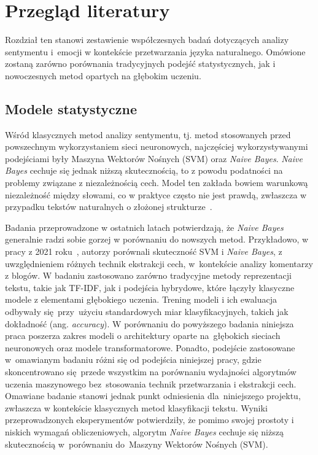 \chapter{Przegląd literatury}
Rozdział ten stanowi zestawienie współczesnych badań dotyczących analizy sentymentu i~emocji w kontekście przetwarzania języka naturalnego. Omówione zostaną zarówno porównania tradycyjnych podejść statystycznych, jak i nowoczesnych metod opartych na głębokim uczeniu.

\section{Modele statystyczne}
Wśród klasycznych metod analizy sentymentu, tj. metod stosowanych przed powszechnym wykorzystaniem sieci neuronowych, najczęściej wykorzystywanymi podejściami były Maszyna Wektorów Nośnych (SVM) oraz \textit{Naive Bayes}. \textit{Naive Bayes} cechuje się jednak niższą skutecznością, to z powodu podatności na problemy związane z niezależnością cech. Model ten zakłada bowiem warunkową niezależność między słowami, co w praktyce często nie jest prawdą, zwłaszcza w przypadku tekstów naturalnych o złożonej strukturze~\cite{OracleBayes}. 

Badania przeprowadzone w ostatnich latach potwierdzają, że \textit{Naive Bayes} generalnie radzi sobie gorzej w porównaniu do nowszych metod. Przykładowo, w pracy z 2021 roku~\cite{TextClassOnBigData}, autorzy porównali skuteczność SVM i \textit{Naive Bayes}, z uwzględnieniem różnych technik ekstrakcji cech, w~kontekście analizy komentarzy z blogów. W badaniu zastosowano zarówno tradycyjne metody reprezentacji tekstu, takie jak TF-IDF, jak i podejścia hybrydowe, które łączyły klasyczne modele z elementami głębokiego uczenia. Trening modeli i ich ewaluacja odbywały się~przy~użyciu standardowych miar klasyfikacyjnych, takich jak dokładność (ang. \textit{accuracy}). W porównaniu do powyższego badania niniejsza praca poszerza zakres modeli o architektury oparte na~głębokich sieciach neuronowych oraz modele transformatorowe. Ponadto, podejście zastosowane w~omawianym badaniu różni się od podejścia niniejszej pracy, gdzie skoncentrowano się~przede wszystkim na porównaniu wydajności algorytmów uczenia maszynowego bez~stosowania technik przetwarzania i ekstrakcji cech. Omawiane badanie stanowi jednak punkt odniesienia dla~niniejszego projektu, zwłaszcza w kontekście klasycznych metod klasyfikacji tekstu. Wyniki przeprowadzonych eksperymentów potwierdziły, że pomimo swojej prostoty i niskich wymagań obliczeniowych, algorytm \textit{Naive Bayes} cechuje się niższą skutecznością w~porównaniu do~Maszyny Wektorów Nośnych (SVM).

